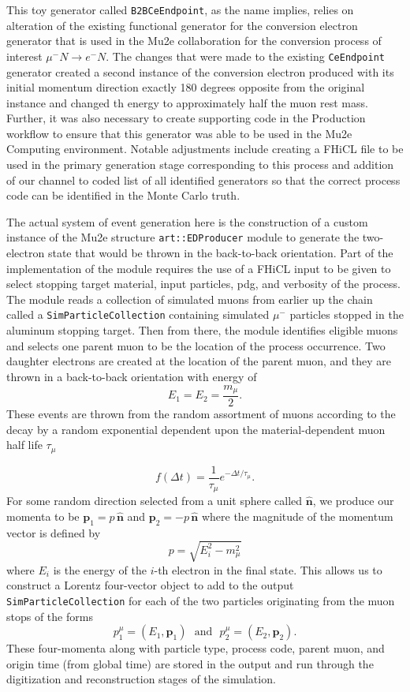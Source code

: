 \documentclass[12pt]{article}
\newcommand{\muToe}{\mu^- N \to e^- N}
\begin{document}
This toy generator called \verb|B2BCeEndpoint|, as the name implies, relies on alteration of the existing functional generator for the conversion electron generator that is used in the Mu2e collaboration for the conversion process of interest $\muToe$. The changes that were made to the existing \verb|CeEndpoint| generator created a second instance of the conversion electron produced with its initial momentum direction exactly 180 degrees opposite from the original instance and changed th energy to approximately half the muon rest mass. Further, it was also necessary to create supporting code in the Production workflow to ensure that this generator was able to be used in the Mu2e Computing environment. Notable adjustments include creating a FHiCL file to be used in the primary generation stage corresponding to this process and addition of our channel to coded list of all identified generators so that the correct process code can be identified in the Monte Carlo truth. 

The actual system of event generation here is the construction of a custom instance of the Mu2e structure \verb|art::EDProducer| module to generate the two-electron state that would be thrown in the back-to-back orientation. Part of the implementation of the module requires the use of a FHiCL input to be given to select stopping target material, input particles, pdg, and verbosity of the process. The module reads a collection of simulated muons from earlier up the chain called a \verb|SimParticleCollection| containing simulated $\mu^-$ particles stopped in the aluminum stopping target. Then from there, the module identifies eligible muons and selects one parent muon to be the location of the process occurrence. Two daughter electrons are created at the location of the parent muon, and they are thrown in a back-to-back orientation with energy of 
$$
E_1 = E_2 = \frac{m_\mu}{2}.
$$
These events are thrown from the random assortment of muons according to the decay by a random exponential dependent upon the material-dependent muon half life $\tau_\mu$

$$
f(\Delta t)=\frac{1}{\tau_\mu}e^{-\Delta t/\tau_\mu}.
$$
For some random direction selected from a unit sphere called $\hat{\mathbf{n}}$, we produce our momenta to be $\mathbf{p}_1=p\,\hat{\mathbf{n}}$ and $\mathbf{p}_2=-p\,\hat{\mathbf{n}}$ where the magnitude of the momentum vector is defined by 
$$p=\sqrt{E_i^2-m_\mu^2}$$
where $E_i$ is the energy of the $i$-th electron in the final state. This allows us to construct a Lorentz four-vector object to add to the output \verb|SimParticleCollection| for each of the two particles originating from the muon stops of the forms
$$
p_1^\mu = (E_1,\mathbf{p}_1) \ \ \ \text{and} \ \ \ p_2^\mu = (E_2,\mathbf{p}_2).
$$
These four-momenta along with particle type, process code, parent muon, and origin time (from global time) are stored in the output and run through the digitization and reconstruction stages of the simulation. 
\end{document}
